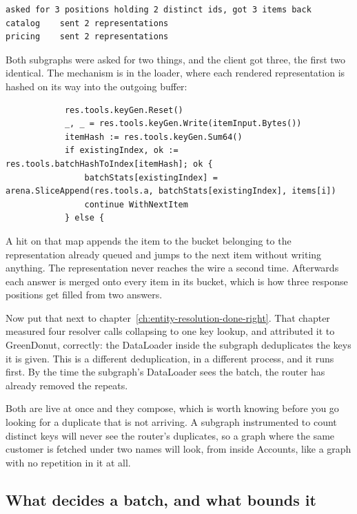 \begin{verbatim}
asked for 3 positions holding 2 distinct ids, got 3 items back
catalog    sent 2 representations
pricing    sent 2 representations
\end{verbatim}

Both subgraphs were asked for two things, and the client got three, the first
two identical. The mechanism is in the loader, where each rendered
representation is hashed on its way into the outgoing buffer:

\begin{verbatim}
			res.tools.keyGen.Reset()
			_, _ = res.tools.keyGen.Write(itemInput.Bytes())
			itemHash := res.tools.keyGen.Sum64()
			if existingIndex, ok := res.tools.batchHashToIndex[itemHash]; ok {
				batchStats[existingIndex] = arena.SliceAppend(res.tools.a, batchStats[existingIndex], items[i])
				continue WithNextItem
			} else {
\end{verbatim}

A hit on that map appends the item to the bucket belonging to the representation
already queued and jumps to the next item without writing anything. The
representation never reaches the wire a second time. Afterwards each answer is
merged onto every item in its bucket, which is how three response positions get
filled from two answers.

%
Now put that next to chapter~\ref{ch:entity-resolution-done-right}. That chapter
measured four resolver calls collapsing to one key lookup, and attributed it to
GreenDonut, correctly: the DataLoader inside the subgraph deduplicates the keys
it is given. This is a different deduplication, in a different process, and it
runs first. By the time the subgraph's DataLoader sees the batch, the router has
already removed the repeats.

Both are live at once and they compose, which is worth knowing before you go
looking for a duplicate that is not arriving. A subgraph instrumented to count
distinct keys will never see the router's duplicates, so a graph where the same
customer is fetched under two names will look, from inside Accounts, like a
graph with no repetition in it at all.

\subsection*{What decides a batch, and what bounds it}

